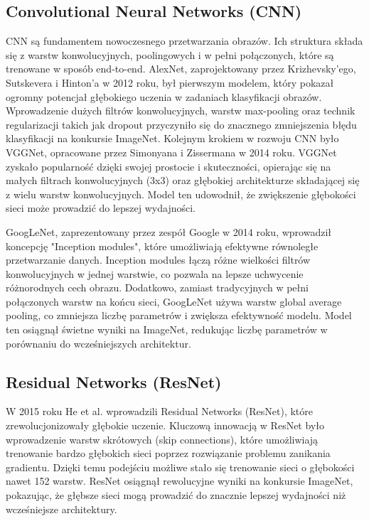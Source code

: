 \subsection*{Convolutional Neural Networks (CNN)}

CNN są fundamentem nowoczesnego przetwarzania obrazów. Ich struktura składa się z warstw 
konwolucyjnych, poolingowych i w pełni połączonych, które są trenowane w sposób end-to-end. 
AlexNet, zaprojektowany przez Krizhevsky'ego, Sutskevera i Hinton’a w 2012 roku, był pierwszym 
modelem, który pokazał ogromny potencjał głębokiego uczenia w zadaniach klasyfikacji obrazów. 
Wprowadzenie dużych filtrów konwolucyjnych, warstw max-pooling oraz technik regularizacji takich 
jak dropout przyczyniło się do znacznego zmniejszenia błędu klasyfikacji na konkursie ImageNet. 
Kolejnym krokiem w rozwoju CNN było VGGNet, opracowane przez Simonyana i Zissermana w 2014 roku. 
VGGNet zyskało popularność dzięki swojej prostocie i skuteczności, opierając się na małych filtrach 
konwolucyjnych (3x3) oraz głębokiej architekturze składającej się z wielu warstw konwolucyjnych. 
Model ten udowodnił, że zwiększenie głębokości sieci może prowadzić do lepszej wydajności.

GoogLeNet, zaprezentowany przez zespół Google w 2014 roku, wprowadził koncepcję "Inception modules", 
które umożliwiają efektywne równoległe przetwarzanie danych. Inception modules łączą różne wielkości 
filtrów konwolucyjnych w jednej warstwie, co pozwala na lepsze uchwycenie różnorodnych cech obrazu. 
Dodatkowo, zamiast tradycyjnych w pełni połączonych warstw na końcu sieci, GoogLeNet używa warstw 
global average pooling, co zmniejsza liczbę parametrów i zwiększa efektywność modelu. 
Model ten osiągnął świetne wyniki na ImageNet, redukując liczbę parametrów w porównaniu do 
wcześniejszych architektur.

\subsection*{Residual Networks (ResNet)}

W 2015 roku He et al. wprowadzili Residual Networks (ResNet), które zrewolucjonizowały głębokie 
uczenie. Kluczową innowacją w ResNet było wprowadzenie warstw skrótowych (skip connections), które 
umożliwiają trenowanie bardzo głębokich sieci poprzez rozwiązanie problemu zanikania gradientu. 
Dzięki temu podejściu możliwe stało się trenowanie sieci o głębokości nawet 152 warstw. ResNet 
osiągnął rewolucyjne wyniki na konkursie ImageNet, pokazując, że głębsze sieci mogą prowadzić do 
znacznie lepszej wydajności niż wcześniejsze architektury.

